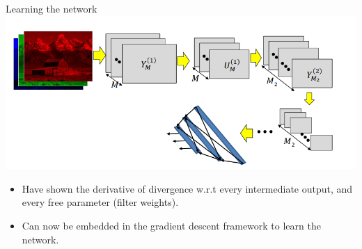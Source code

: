 \documentclass[serif, aspectratio=169]{beamer}
\begin{document}
	
	\begin{frame}{Learning the network}
		\centering
		\includegraphics[keepaspectratio, scale=0.6]{pic/training6.png}
		\smallskip
		
		\begin{itemize}
			\item Have shown the derivative of divergence w.r.t every intermediate output, and every free parameter (filter weights).
			\item Can now be embedded in the gradient descent framework to learn the network.
		\end{itemize}
		
	
	
	\end{frame}	
\end{document}
